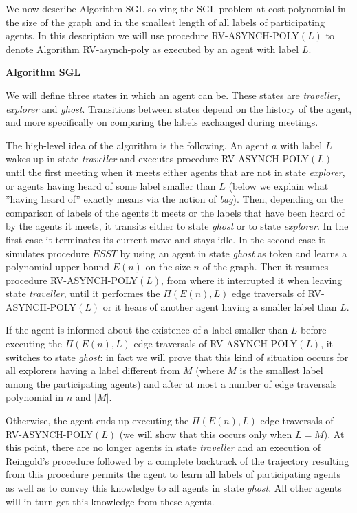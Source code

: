 \documentclass [11pt] {article}
\begin{document}
We now describe Algorithm SGL solving the SGL problem at cost polynomial in the size of the graph 
and in the smallest length of all labels of participating agents.  In this description we will use procedure RV-ASYNCH-POLY$(L)$ to denote Algorithm RV-asynch-poly
as executed by an agent with label $L$. 

\vspace*{0.3cm}

\noindent
{\bf Algorithm SGL}


{We will define three states in which an agent can be. These states are {\em traveller}, {\em explorer}
and {\em ghost}. Transitions between states depend on the history of the agent, and more specifically on comparing the labels exchanged during meetings.} 

{The high-level idea of the algorithm is the following. An agent $a$ with label $L$ wakes up in state {\em traveller} and executes procedure RV-ASYNCH-POLY$(L)$ until the first meeting when it meets either agents that are not in state {\em explorer}, or agents having heard of some label smaller than $L$ (below we explain what ''having heard of'' exactly means via the notion of {\em bag}).}
{Then, depending on the comparison of labels of the agents it meets or the labels that have been heard of by the agents it meets, it transits either to state {\em ghost} or to state {\em explorer}. In the first case it terminates its current move and stays idle.
In the second case it simulates procedure $ESST$ by using an agent in state {\em ghost} as token and learns a polynomial upper bound $E(n)$ on the size $n$ of the graph. Then it resumes procedure RV-ASYNCH-POLY$(L)$, from where it interrupted it when leaving state {\em traveller}, until it performes the $\Pi(E(n),L)$ edge traversals of RV-ASYNCH-POLY$(L)$ or it hears of another agent having a smaller label than $L$.}

{If the agent is informed about the existence of a label smaller than $L$ before executing the $\Pi(E(n),L)$ edge traversals of RV-ASYNCH-POLY$(L)$, it switches to state {\em ghost}: in fact we will prove that this kind of situation occurs for all explorers having a label different from $M$ (where $M$ is the smallest label among the participating agents) and after at most a number of edge traversals polynomial in $n$ and $|M|$.} 

{Otherwise, the agent ends up executing the $\Pi(E(n),L)$ edge traversals of RV-ASYNCH-POLY$(L)$ (we will show that this occurs only when $L=M$).
At this point, there are no longer agents in state {\em traveller} and an execution of Reingold's procedure
followed by a complete backtrack of the trajectory resulting from this procedure permits the agent to learn all labels of participating agents as well as to convey this knowledge to all agents in state {\em ghost}.
All other agents will in turn get this knowledge from these agents.}
\end{document}
